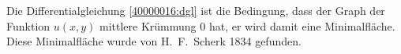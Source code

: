 \begin{diskussion}
Die Differentialgleichung \eqref{40000016:dgl} ist die Bedingung, dass der
Graph der Funktion $u(x,y)$ mittlere Krümmung $0$ hat, er wird damit eine
Minimalfläche.
Diese Minimalfläche wurde von H.~F.~Scherk 1834 gefunden.
\end{diskussion}
